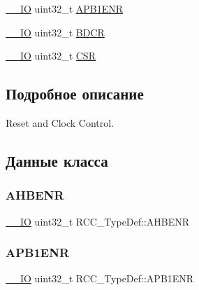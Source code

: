 \begin{DoxyCompactItemize}
\item 
\mbox{\hyperlink{group___c_m_s_i_s___c_m3__core__definitions_gaec43007d9998a0a0e01faede4133d6be}{\+\_\+\+\_\+\+IO}} uint32\+\_\+t \mbox{\hyperlink{struct_r_c_c___type_def_aec7622ba90341c9faf843d9ee54a759f}{A\+P\+B1\+E\+NR}}
\item 
\mbox{\hyperlink{group___c_m_s_i_s___c_m3__core__definitions_gaec43007d9998a0a0e01faede4133d6be}{\+\_\+\+\_\+\+IO}} uint32\+\_\+t \mbox{\hyperlink{struct_r_c_c___type_def_a05be375db50e8c9dd24fb3bcf42d7cf1}{B\+D\+CR}}
\item 
\mbox{\hyperlink{group___c_m_s_i_s___c_m3__core__definitions_gaec43007d9998a0a0e01faede4133d6be}{\+\_\+\+\_\+\+IO}} uint32\+\_\+t \mbox{\hyperlink{struct_r_c_c___type_def_a7e913b8bf59d4351e1f3d19387bd05b9}{C\+SR}}
\end{DoxyCompactItemize}


\subsection{Подробное описание}
Reset and Clock Control. 

\subsection{Данные класса}
\mbox{\label{struct_r_c_c___type_def_abaebc9204bbc1708356435a5a01e70eb}} 
\subsubsection{\texorpdfstring{AHBENR}{AHBENR}}
{\footnotesize\ttfamily \mbox{\hyperlink{group___c_m_s_i_s___c_m3__core__definitions_gaec43007d9998a0a0e01faede4133d6be}{\+\_\+\+\_\+\+IO}} uint32\+\_\+t R\+C\+C\+\_\+\+Type\+Def\+::\+A\+H\+B\+E\+NR}

\mbox{\label{struct_r_c_c___type_def_aec7622ba90341c9faf843d9ee54a759f}} 
\subsubsection{\texorpdfstring{APB1ENR}{APB1ENR}}
{\footnotesize\ttfamily \mbox{\hyperlink{group___c_m_s_i_s___c_m3__core__definitions_gaec43007d9998a0a0e01faede4133d6be}{\+\_\+\+\_\+\+IO}} uint32\+\_\+t R\+C\+C\+\_\+\+Type\+Def\+::\+A\+P\+B1\+E\+NR}

